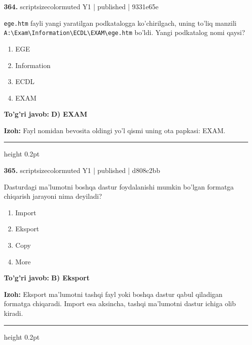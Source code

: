 \documentclass[10pt,a4paper]{article}
\begin{document}
{\bfseries\sffamily\color{ink} 364.} {scriptsizecolor{muted} Y1 | published | 9331e65e}
\par
\texttt{ege.htm} fayli yangi yaratilgan podkatalogga ko'chirilgach, uning to'liq manzili \texttt{A:\textbackslash{}Exam\textbackslash{}Information\textbackslash{}ECDL\textbackslash{}EXAM\textbackslash{}ege.htm} bo'ldi. Yangi podkatalog nomi qaysi?
\begin{enumerate}[label=\Alph*),leftmargin=9mm]
\item EGE
\item Information
\item ECDL
\item EXAM
\end{enumerate}
\begin{tcolorbox}[enhanced,breakable,colback=teal!4,colframe=teal!60!black,boxrule=0.45pt,arc=1.2mm,left=2.7mm,right=2.7mm,top=1.8mm,bottom=1.8mm,before skip=2mm,after skip=2mm]
{\bfseries\sffamily\color{teal}To'g'ri javob:} \textbf{D) EXAM}
\par\smallskip
{\bfseries Izoh:} Fayl nomidan bevosita oldingi yo'l qismi uning ota papkasi: EXAM.
\end{tcolorbox}
\vspace{2mm}\hrule height 0.2pt\vspace{3mm}

{\bfseries\sffamily\color{ink} 365.} {scriptsizecolor{muted} Y1 | published | d808c2bb}
\par
Dasturdagi ma'lumotni boshqa dastur foydalanishi mumkin bo'lgan formatga chiqarish jarayoni nima deyiladi?
\begin{enumerate}[label=\Alph*),leftmargin=9mm]
\item Import
\item Eksport
\item Copy
\item More
\end{enumerate}
\begin{tcolorbox}[enhanced,breakable,colback=teal!4,colframe=teal!60!black,boxrule=0.45pt,arc=1.2mm,left=2.7mm,right=2.7mm,top=1.8mm,bottom=1.8mm,before skip=2mm,after skip=2mm]
{\bfseries\sffamily\color{teal}To'g'ri javob:} \textbf{B) Eksport}
\par\smallskip
{\bfseries Izoh:} Eksport ma'lumotni tashqi fayl yoki boshqa dastur qabul qiladigan formatga chiqaradi. Import esa aksincha, tashqi ma'lumotni dastur ichiga olib kiradi.
\end{tcolorbox}
\vspace{2mm}\hrule height 0.2pt\vspace{3mm}
\end{document}
